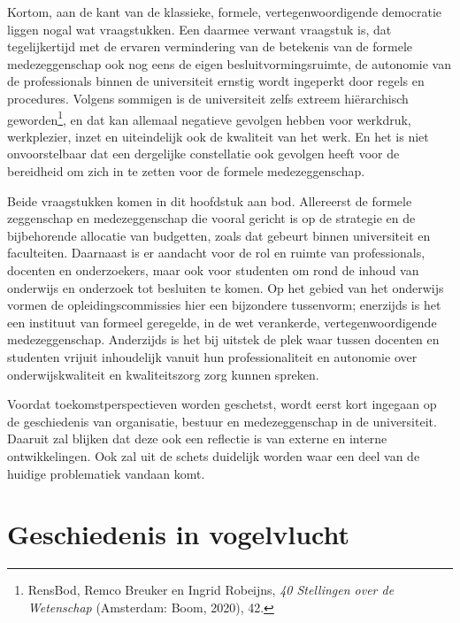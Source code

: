 \documentclass[smallauthor, chapterhaspagenum, nochapterinheader, pagenuminheader,  bigchapnum,medium2, tocpages,  garamond, titleinheader]{jote-book}
\begin{document}
	Kortom, aan de kant van de klassieke, formele, vertegenwoordigende democratie liggen nogal wat vraagstukken. Een daarmee verwant vraagstuk is, dat tegelijkertijd met de ervaren vermindering van de betekenis van de formele medezeggenschap ook nog eens de eigen besluitvormingsruimte, de autonomie van de professionals binnen de universiteit ernstig wordt ingeperkt door regels en procedures. Volgens sommigen is de universiteit zelfs extreem hiërarchisch geworden\footnote{RensBod, Remco Breuker en Ingrid Robeijns, \emph{40 Stellingen over de Wetenschap }(Amsterdam: Boom, 2020), 42.}, en dat kan allemaal negatieve gevolgen hebben voor werkdruk, werkplezier, inzet en uiteindelijk ook de kwaliteit van het werk. En het is niet onvoorstelbaar dat een dergelijke constellatie ook gevolgen heeft voor de bereidheid om zich in te zetten voor de formele medezeggenschap.



	Beide vraagstukken komen in dit hoofdstuk aan bod. Allereerst de formele zeggenschap en medezeggenschap die vooral gericht is op de strategie en de bijbehorende allocatie van budgetten, zoals dat gebeurt binnen universiteit en faculteiten. Daarnaast is er aandacht voor de rol en ruimte van professionals, docenten en onderzoekers, maar ook voor studenten om rond de inhoud van onderwijs en onderzoek tot besluiten te komen. Op het gebied van het onderwijs vormen de opleidingscommissies hier een bijzondere tussenvorm; enerzijds is het een instituut van formeel geregelde, in de wet verankerde, vertegenwoordigende medezeggenschap. Anderzijds is het bij uitstek de plek waar tussen docenten en studenten vrijuit inhoudelijk vanuit hun professionaliteit en autonomie over onderwijskwaliteit en kwaliteitszorg zorg kunnen spreken.



	Voordat toekomstperspectieven worden geschetst, wordt eerst kort ingegaan op de geschiedenis van organisatie, bestuur en medezeggenschap in de universiteit. Daaruit zal blijken dat deze ook een reflectie is van externe en interne ontwikkelingen. Ook zal uit de schets duidelijk worden waar een deel van de huidige problematiek vandaan komt.



	\section{Geschiedenis in vogelvlucht}
\end{document}
